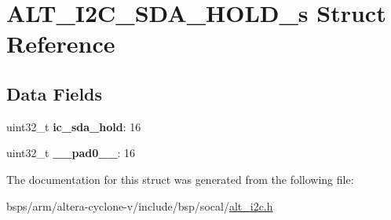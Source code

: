 \hypertarget{structALT__I2C__SDA__HOLD__s}{}\section{A\+L\+T\+\_\+\+I2\+C\+\_\+\+S\+D\+A\+\_\+\+H\+O\+L\+D\+\_\+s Struct Reference}
\label{structALT__I2C__SDA__HOLD__s}
\subsection*{Data Fields}
\begin{DoxyCompactItemize}
\item 
\mbox{\label{structALT__I2C__SDA__HOLD__s_ac82bc4b8292665edf070552105e3c87a}} 
uint32\+\_\+t {\bfseries ic\+\_\+sda\+\_\+hold}\+: 16
\item 
\mbox{\label{structALT__I2C__SDA__HOLD__s_a055e5fe0414a2bdf51e8e29558c19235}} 
uint32\+\_\+t {\bfseries \+\_\+\+\_\+pad0\+\_\+\+\_\+}\+: 16
\end{DoxyCompactItemize}


The documentation for this struct was generated from the following file\+:\begin{DoxyCompactItemize}
\item 
bsps/arm/altera-\/cyclone-\/v/include/bsp/socal/\mbox{\hyperlink{socal_2alt__i2c_8h}{alt\+\_\+i2c.\+h}}\end{DoxyCompactItemize}
